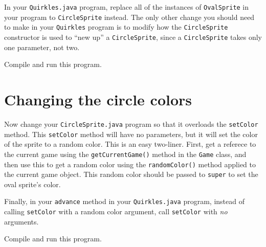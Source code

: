 \documentclass[12pt]{article}
\begin{document}
In your \verb'Quirkles.java' program,
replace all of the instances of \verb'OvalSprite' in your program
to \verb'CircleSprite' instead.
The only other change you should need
to make in your \verb'Quirkles' program
is to modify how the \verb'CircleSprite' constructor is used
to ``new up'' a \verb'CircleSprite',
since a \verb'CircleSprite' takes only one parameter, not two.

Compile and run this program.


\section*{Changing the circle colors}
Now change your \verb'CircleSprite.java' program
so that it overloads the \verb'setColor' method.
This \verb'setColor' method will have no parameters,
but it will set the color of the sprite to a random color.
This is an easy two-liner.
First, get a referece to the current game
using the \verb'getCurrentGame()' method in the \verb'Game' class,
and then use this to get a random color
using the \verb'randomColor()' method applied
to the current game object.
This random color should be passed to \verb'super'
to set the oval sprite's color.

Finally, in your \verb'advance' method
in your \verb'Quirkles.java' program,
instead of calling \verb'setColor' with a random color argument,
call \verb'setColor' with {\em no} arguments.

Compile and run this program.

\end{document}
